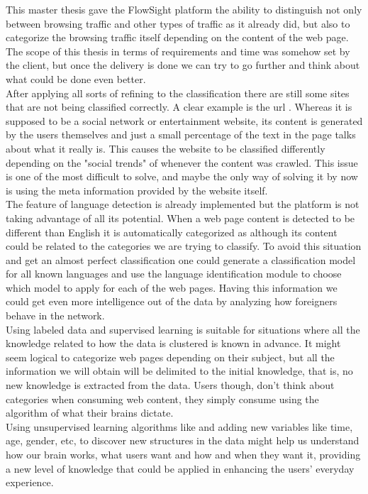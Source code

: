This master thesis gave the FlowSight platform the ability to distinguish not only between browsing traffic and other types of traffic as it already did, but also to categorize the browsing traffic 
itself depending on the content of the web page. \\ 


The scope of this thesis in terms of requirements and time was somehow set by the client, but once the delivery is done we can try to go further and think about what could be done even better.\\
After applying all sorts of refining to the classification there are still some sites that are not being classified correctly. A clear example is the url . Whereas it is supposed to be
a social network or entertainment website, its content is generated by the users themselves and just a small percentage of the text in the page talks about what it really is.
This causes the website to be classified differently depending on the "social trends" of whenever the content was crawled. This issue is one of the most difficult to solve, and maybe the only way 
of solving it by now is using the meta information provided by the website itself.\\

The feature of language detection is already implemented but the platform is not taking advantage of all its potential. When a web page content is detected to be different than English it is automatically
categorized as  although its content could be related to the categories we are trying to classify. To avoid this situation and get an almost perfect classification one could generate a 
classification model for all known languages and use the language identification module to choose which model to apply for each of the web pages. Having this information we could get even more intelligence
out of the data by analyzing how foreigners behave in the network.\\

Using labeled data and supervised learning is suitable for situations where all the knowledge related to how the data is clustered is known in advance. It might seem logical to categorize web pages
depending on their subject, but all the information we will obtain will be delimited to the initial knowledge, that is, no new knowledge is extracted from the data. Users though, don't think about
categories when consuming web content, they simply consume using the algorithm of what their brains dictate.\\
Using unsupervised learning algorithms like  and adding new variables like 
time, age, gender, etc, to discover new structures in the data might help us understand how our brain works, what users want and how and when they want it, providing a new level of knowledge that could
be applied in enhancing the users' everyday experience.

